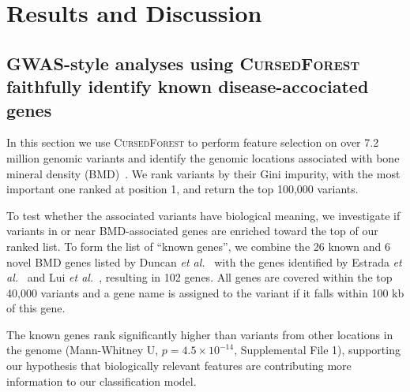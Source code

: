 \documentclass[10pt,letterpaper]{article}
\newcommand{\cursedforest}{\textsc{CursedForest}\xspace}
\begin{document}
%
%
\section{Results and Discussion}


\subsection{GWAS-style analyses using \cursedforest faithfully identify known disease-accociated genes}
In this section we use \cursedforest to perform feature selection on over 7.2 million genomic variants and identify the
genomic locations associated with bone mineral density (BMD)~\cite{Duncan.2011}. 
We rank variants by their Gini impurity, with the most important one ranked at position 1, and return the top 100,000 variants.

To test whether the associated variants have biological meaning, we investigate if variants in or near
BMD-associated genes are enriched toward the top of our ranked list. To form the list of ``known genes'', we
combine the 26 known and 6 novel BMD genes listed by Duncan {\it et al.}~\cite{Duncan.2011} with the genes identified by
Estrada {\it et al.}~\cite{Estrada2012} and Lui {\it et al.}~\cite{Liu2008}, resulting in 102 genes.  All genes are covered within the
top 40,000 variants and a gene name is assigned to the variant if it falls within 100 kb of this gene.

The known genes rank significantly higher than variants from other locations in the genome (Mann-Whitney U, $p=4.5\times10^{-14}$, Supplemental File 1), 
supporting our hypothesis that biologically relevant features are contributing more information to our classification model.
\end{document}
